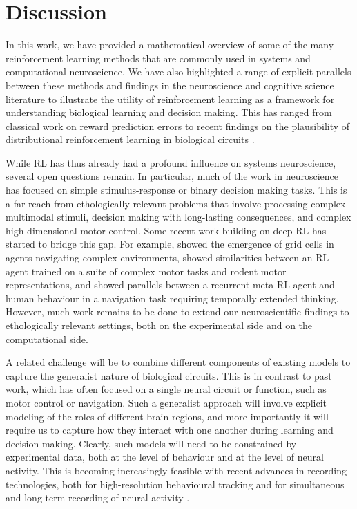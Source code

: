 \section{Discussion}
\label{sec:discussion}

In this work, we have provided a mathematical overview of some of the many reinforcement learning methods that are commonly used in systems and computational neuroscience.
We have also highlighted a range of explicit parallels between these methods and findings in the neuroscience and cognitive science literature to illustrate the utility of reinforcement learning as a framework for understanding biological learning and decision making.
This has ranged from classical work on reward prediction errors \citep{schultz1997neural} to recent findings on the plausibility of distributional reinforcement learning in biological circuits \citep{dabney2020distributional}.

While RL has thus already had a profound influence on systems neuroscience, several open questions remain.
In particular, much of the work in neuroscience has focused on simple stimulus-response or binary decision making tasks.
This is a far reach from ethologically relevant problems that involve processing complex multimodal stimuli, decision making with long-lasting consequences, and complex high-dimensional motor control.
Some recent work building on deep RL has started to bridge this gap.
For example, \citet{banino2018vector} showed the emergence of grid cells in agents navigating complex environments, \citet{merel2019deep} showed similarities between an RL agent trained on a suite of complex motor tasks and rodent motor representations, and \citet{jensen2023recurrent} showed parallels between a recurrent meta-RL agent and human behaviour in a navigation task requiring temporally extended thinking.
However, much work remains to be done to extend our neuroscientific findings to ethologically relevant settings, both on the experimental side and on the computational side.

A related challenge will be to combine different components of existing models to capture the generalist nature of biological circuits.
This is in contrast to past work, which has often focused on a single neural circuit or function, such as motor control or navigation.
Such a generalist approach will involve explicit modeling of the roles of different brain regions, and more importantly it will require us to capture how they interact with one another during learning and decision making.
Clearly, such models will need to be constrained by experimental data, both at the level of behaviour and at the level of neural activity.
This is becoming increasingly feasible with recent advances in recording technologies, both for high-resolution behavioural tracking \citep{mathis2018deeplabcut,dunn2021geometric} and for simultaneous and long-term recording of neural activity \citep{steinmetz2021neuropixels, pachitariu2016suite2p, dhawale2017automated}.

